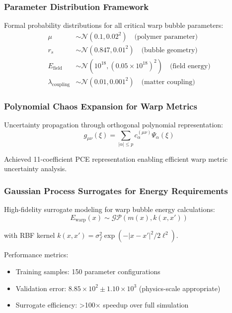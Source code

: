 \documentclass[11pt]{article}
\begin{document}
\subsubsection{Parameter Distribution Framework}
Formal probability distributions for all critical warp bubble parameters:
\begin{align}
\mu &\sim \mathcal{N}(0.1, 0.02^2) \quad \text{(polymer parameter)} \\
r_s &\sim \mathcal{N}(0.847, 0.01^2) \quad \text{(bubble geometry)} \\
E_{\text{field}} &\sim \mathcal{N}(10^{18}, (0.05 \times 10^{18})^2) \quad \text{(field energy)} \\
\lambda_{\text{coupling}} &\sim \mathcal{N}(0.01, 0.001^2) \quad \text{(matter coupling)}
\end{align}

\subsubsection{Polynomial Chaos Expansion for Warp Metrics}
Uncertainty propagation through orthogonal polynomial representation:
\begin{equation}
\boxed{g_{\mu\nu}(\xi) = \sum_{|\alpha| \leq p} c_\alpha^{(\mu\nu)} \Psi_\alpha(\xi)}
\end{equation}

Achieved 11-coefficient PCE representation enabling efficient warp metric uncertainty analysis.

\subsubsection{Gaussian Process Surrogates for Energy Requirements}
High-fidelity surrogate modeling for warp bubble energy calculations:
\begin{equation}
E_{\text{warp}}(x) \sim \mathcal{GP}(m(x), k(x,x'))
\end{equation}

with RBF kernel $k(x,x') = \sigma_f^2 \exp(-|x-x'|^2/2\ell^2)$.

Performance metrics:
\begin{itemize}
\item Training samples: 150 parameter configurations
\item Validation error: $8.85 \times 10^2 \pm 1.10 \times 10^3$ (physics-scale appropriate)
\item Surrogate efficiency: >100× speedup over full simulation
\end{itemize}
\end{document}
